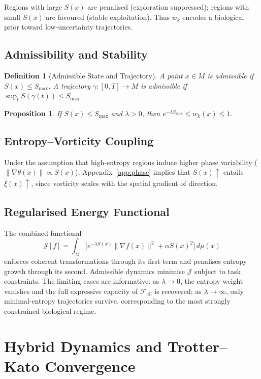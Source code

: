 \documentclass[12pt, a4paper]{article}
\newtheorem{definition}[theorem]{Definition}
\newtheorem{proposition}[theorem]{Proposition}
\theoremstyle{remark}
\theoremstyle{definition}
\begin{document}
Regions with large $S(x)$ are penalised (exploration suppressed); regions with small
$S(x)$ are favoured (stable exploitation).  Thus $w_k$ encodes a biological prior toward
low-uncertainty trajectories.

\subsection{Admissibility and Stability}

\begin{definition}[Admissible State and Trajectory]
A point $x \in M$ is admissible if $S(x) \le S_{\max}$.  A trajectory $\gamma\colon[0,T]\to M$
is admissible if $\sup_{t} S(\gamma(t)) \le S_{\max}$.
\end{definition}

\begin{proposition}
If $S(x) \le S_{\max}$ and $\lambda > 0$, then $e^{-\lambda S_{\max}} \le w_k(x) \le 1$.
\end{proposition}

\subsection{Entropy--Vorticity Coupling}

Under the assumption that high-entropy regions induce higher phase variability
($\|\nabla\theta(x)\| \propto S(x)$), Appendix~\ref{app:phase} implies that
$S(x) \uparrow$ entails $\xi(x) \uparrow$, since vorticity scales with the spatial
gradient of direction.

\subsection{Regularised Energy Functional}

The combined functional
\[
\mathcal{J}[f]
= \int_M \bigl[e^{-\lambda S(x)}\|\nabla f(x)\|^2
+ \alpha S(x)^2\bigr]\,d\mu(x)
\]
enforces coherent transformations through its first term and penalises entropy growth
through its second.  Admissible dynamics minimise $\mathcal{J}$ subject to task
constraints.  The limiting cases are informative: as $\lambda \to 0$, the entropy weight
vanishes and the full expressive capacity of $\mathcal{F}_{\mathrm{all}}$ is recovered;
as $\lambda \to \infty$, only minimal-entropy trajectories survive, corresponding to the
most strongly constrained biological regime.

\section{Hybrid Dynamics and Trotter--Kato Convergence}
\label{app:hybrid}
\end{document}
